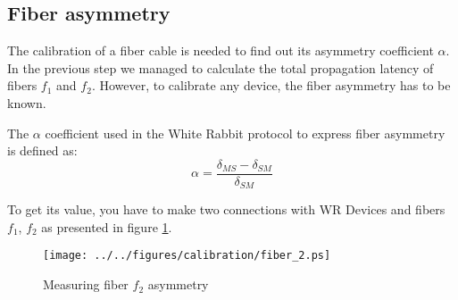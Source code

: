 \subsection{Fiber asymmetry}
\label{subsec:fiasym}

The calibration of a fiber cable is needed to find out its asymmetry coefficient
$\alpha$. In the previous step we managed to calculate the total propagation
latency of fibers $f_1$ and $f_2$. However, to calibrate any device, the fiber
asymmetry has to be known.

The $\alpha$ coefficient used in the White Rabbit protocol to express fiber 
asymmetry is defined as:
\begin{equation}
	\alpha = \frac{\delta_{MS} - \delta_{SM}}{\delta_{SM}}
\end{equation}

To get its value, you have to make two connections with WR Devices and fibers
$f_1$, $f_2$ as presented in figure \ref{fig:fiasym}.

\begin{figure}[ht]
	\begin{center}
		\texttt{[image: ../../figures/calibration/fiber\_2.ps]}
		\caption{Measuring fiber $f_2$ asymmetry}
		\label{fig:fiasym}
	\end{center}
\end{figure}

